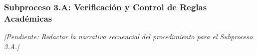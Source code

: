\subsubsection{Subproceso 3.A: Verificación y Control de Reglas Académicas}

\textit{[Pendiente: Redactar la narrativa secuencial del procedimiento para el Subproceso 3.A.]}

